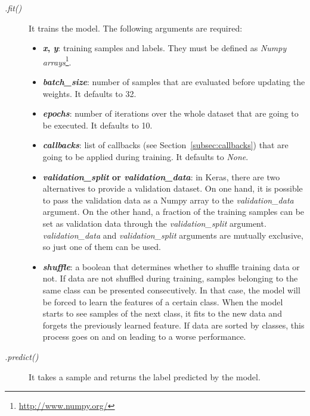 \begin{description}
	\item[\textit{.fit()}] It trains the model. The following arguments are required:
	\begin{itemize}
		\item \textbf{\textit{x}, \textit{y}}: training samples and labels. They must be defined as \emph{Numpy arrays}\footnote{\url{http://www.numpy.org/}}.
		
		\item \textbf{\textit{batch\_size}}: number of samples that are evaluated before updating the weights. It defaults to 32.
		
		\item \textbf{\textit{epochs}}: number of iterations over the whole dataset that are going to be executed. It defaults to 10.
		
		\item \textbf{\textit{callbacks}}: list of callbacks (see Section~\ref{subsec:callbacks}) that are going to be applied during training. It defaults to \textit{None}.
		
		\item \textbf{\textit{validation\_split} or \textit{validation\_data}}: in Keras, there are two alternatives to provide a validation dataset. On one hand, it is possible to pass the validation data as a Numpy array to the \textit{validation\_data} argument. On the other hand, a fraction of the training samples can be set as validation data through the \textit{validation\_split} argument. \textit{validation\_data} and  \textit{validation\_split} arguments are mutually exclusive, so just one of them can be used.
		
		\item \textbf{\textit{shuffle}}: a boolean that determines whether to shuffle training data or not. If data are not shuffled during training, samples belonging to the same class can be presented consecutively. In that case, the model will be forced to learn the features of a certain class. When the model starts to see samples of the next class, it fits to the new data and forgets the previously learned feature. If data are sorted by classes, this process goes on and on leading to a worse performance.
	\end{itemize}
\end{description}

\begin{description}
	\item[\textit{.predict()}] It takes a sample and returns the label predicted by the model.
\end{description}

